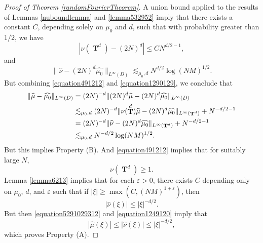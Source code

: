 \documentclass[12pt,reqno]{article}
\DeclareMathOperator{\TT}{\mathbf{T}}
\begin{document}
\begin{proof}[Proof of Theorem \ref{randomFourierTheorem}]
    A union bound applied to the results of Lemmas \ref{nuboundlemma} and \ref{lemma532952} imply that there exists a constant $C$, depending solely on $\mu_0$ and $d$, such that with probability greater than $1/2$, we have
    \begin{equation}\label{equation491212}
        |\nu(\TT^d) - (2N)^d| \leq C N^{d/2-1},
    \end{equation}
    and
    \begin{equation}\label{equation1290129}
    \| \widehat{\nu} - (2N)^d \widehat{\mu_0} \|_{L^\infty(D)} \lesssim_{\mu_0,d} N^{d/2} \log(NM)^{1/2}.
    \end{equation}
    But combining \eqref{equation491212} and \eqref{equation1290129}, we conclude that
    \begin{align*}
        \| \widehat{\mu} - \widehat{\mu_0} \|_{L^\infty(D)} &= (2N)^{-d} \| (2N)^d \widehat{\mu} - (2N)^d \widehat{\mu_0} \|_{L^\infty(D)}\\
        &\lesssim_{\mu_0,d} (2N)^{-d} \| \nu(\TT^d) \widehat{\mu} - (2N)^d \widehat{\mu_0} \|_{L^\infty(\TT^d)} + N^{-d/2-1} \\
        &= (2N)^{-d} \| \widehat{\nu} - (2N)^d \widehat{\mu_0} \|_{L^\infty(\TT^d)} + N^{-d/2-1}\\
        &\lesssim_{\mu_0,d} N^{-d/2} \log(NM)^{1/2}. \qedhere
    \end{align*}
    But this implies Property (B). And \eqref{equation491212} implies that for suitably large $N$,
    \begin{equation} \label{equation5291029312}
        \nu(\TT^d) \geq 1.
    \end{equation}
    Lemma \eqref{lemma6213} implies that for each $\varepsilon > 0$, there exists $C$ depending only on $\mu_0$, $d$, and $\varepsilon$ such that if $|\xi| \geq \max(C, (NM)^{1+\varepsilon})$, then
    \begin{equation} \label{equation1249120}
        |\widehat{\nu}(\xi)| \leq |\xi|^{-d/2}.
    \end{equation}
    But then \eqref{equation5291029312} and \eqref{equation1249120} imply that
    \[ |\widehat{\mu}(\xi)| \leq |\widehat{\nu}(\xi)| \leq |\xi|^{-d/2}, \]
    which proves Property (A).
\end{proof}
\end{document}
